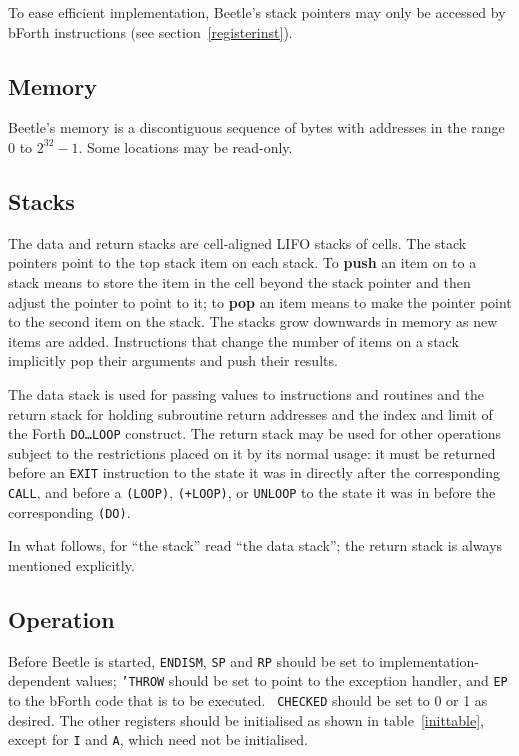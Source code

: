\documentclass[english]{article}
\begin{document}
To ease efficient implementation, Beetle's stack pointers may only be accessed
by bForth instructions (see section~\ref{registerinst}).


\subsection{Memory}

Beetle's memory is a discontiguous sequence of bytes with addresses in the range $0$ to $2^{32}-1$. Some locations may be read-only.


\subsection{Stacks}

The data and return stacks are cell-aligned LIFO stacks of cells. The stack
pointers point to the top stack item on each stack. To {\bf push} an item on to
a stack means to store the item in the cell beyond the stack pointer and then
adjust the pointer to point to it; to {\bf pop} an item means to make the
pointer point to the second item on the stack. The stacks grow downwards in
memory as new items are added. Instructions that change the number of items on a
stack implicitly pop their arguments and push their results.

The data stack is used for passing values to instructions and routines and the
return stack for holding subroutine return addresses and the index and limit of
the Forth {\tt DO\dots LOOP} construct. The return stack may be used for other
operations subject to the restrictions placed on it by its normal usage: it must
be returned before an {\tt EXIT} instruction to the state it was in directly
after the corresponding {\tt CALL}, and before a {\tt (LOOP)}, {\tt (+LOOP)}, or
{\tt UNLOOP} to the state it was in before the corresponding {\tt (DO)}.

In what follows, for ``the stack'' read ``the data stack''; the return stack is
always mentioned explicitly.


\subsection{Operation}
\label{operation}

Before Beetle is started, {\tt ENDISM}, {\tt SP} and {\tt RP} should be set
to implementation-dependent values; {\tt 'THROW} should be set to point to the
exception handler, and {\tt EP} to the bForth code that is to be executed. {\tt
CHECKED} should be set to 0 or 1 as desired. The other registers should be
initialised as shown in table~\ref{inittable}, except for {\tt I} and {\tt A},
which need not be initialised.
\end{document}
